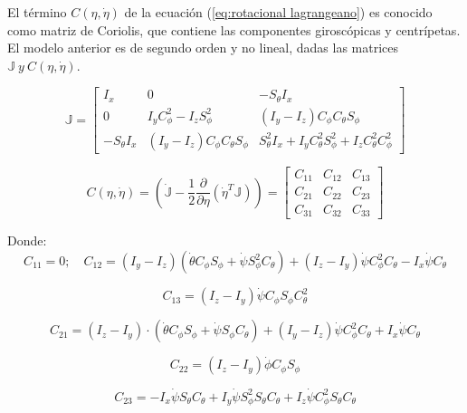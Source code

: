 \documentclass[../main.tex]{subfiles}
\begin{document}
El término $C(\eta,\dot{\eta})$ de la ecuación (\ref{eq:rotacional lagrangeano})
es conocido como matriz de Coriolis, que contiene las componentes
giroscópicas y centrípetas. El modelo anterior es de segundo orden
y no lineal, dadas las matrices $\mathbb{J}\ y\ C(\eta,\dot{\eta})$.

\begin{equation}
\mathbb{J}=\begin{bmatrix}I_{x} & 0 & -S_{\theta}I_{x}\\
0 & I_{y}C_{\phi}^{2}-I_{z}S_{\phi}^{2} & (I_{y}-I_{z})C_{\phi}C_{\theta}S_{\phi}\\
-S_{\theta}I_{x} & (I_{y}-I_{z})C_{\phi}C_{\theta}S_{\phi} & S_{\theta}^{2}I_{x}+I_{y}C_{\theta}^{2}S_{\phi}^{2}+I_{z}C_{\theta}^{2}C_{\phi}^{2}
\end{bmatrix}
\end{equation}

\begin{equation}
C(\eta,\dot{\eta})=(\dot{\mathbb{J}}-\frac{1}{2}\frac{\partial}{\partial\eta}(\dot{\eta}^{T}\mathbb{J}))=\begin{bmatrix}C_{11} & C_{12} & C_{13}\\
C_{21} & C_{22} & C_{23}\\
C_{31} & C_{32} & C_{33}
\end{bmatrix}
\end{equation}

Donde:
\begin{equation}
C_{11}=0;\quad C_{12}=(I_{y}-I_{z})(\dot{\theta}C_{\phi}S_{\phi}+\dot{\psi}S_{\phi}^{2}C_{\theta})+(I_{z}-I_{y})\dot{\psi}C_{\phi}^{2}C_{\theta}-I_{x}\dot{\psi}C_{\theta}
\end{equation}

\begin{equation}
C_{13}=(I_{z}-I_{y})\dot{\psi}C_{\phi}S_{\phi}C_{\theta}^{2}
\end{equation}

\begin{equation}
C_{21}=(I_{z}-I_{y})\cdot(\dot{\theta}C_{\phi}S_{\phi}+\dot{\psi}S_{\phi}C_{\theta})+(I_{y}-I_{z})\dot{\psi}C_{\phi}^{2}C_{\theta}+I_{x}\dot{\psi}C_{\theta}
\end{equation}

\begin{equation}
C_{22}=(I_{z}-I_{y})\dot{\phi}C_{\phi}S_{\phi}
\end{equation}

\begin{equation}
C_{23}=-I_{x}\dot{\psi}S_{\theta}C_{\theta}+I_{y}\dot{\psi}S_{\phi}^{2}S_{\theta}C_{\theta}+I_{z}\dot{\psi}C_{\phi}^{2}S_{\theta}C_{\theta}
\end{equation}
\end{document}
